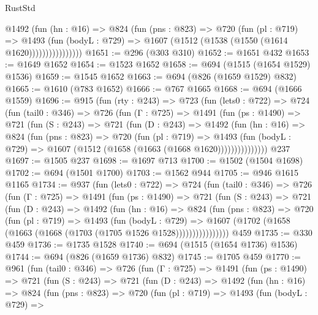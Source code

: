 \begin{lexlean}{RustStd}
\begin{coremodule}
                  @1492
                    (fun (hn : @16) =>
                    @824
                      (fun (pns : @823) =>
                      @720
                        (fun (pl : @719) =>
                        @1493
                          (fun (bodyL : @729) =>
                          @1607 (@1512 (@1538 (@1550 (@1614 @1620))))))))))))))))
@1651 := @296 (@303 @310)
@1652 := @1651 @432
@1653 := @1649 @1652
@1654 := @1523 @1652
@1658 := @694 (@1515 (@1654 @1529) @1536)
@1659 := @1545 @1652
@1663 := @694 (@826 (@1659 @1529) @832)
@1665 := @1610 (@783 @1652)
@1666 := @767 @1665
@1668 := @694 (@1666 @1559)
@1696 := @915
    (fun (rty : @243) =>
    @723
      (fun (lets0 : @722) =>
      @724
        (fun (tail0 : @346) =>
        @726
          (fun (Γ : @725) =>
          @1491
            (fun (ps : @1490) =>
            @721
              (fun (S : @243) =>
              @721
                (fun (D : @243) =>
                @1492
                  (fun (hn : @16) =>
                  @824
                    (fun (pns : @823) =>
                    @720
                      (fun (pl : @719) =>
                      @1493
                        (fun (bodyL : @729) =>
                        @1607 (@1512 (@1658 (@1663 (@1668 @1620)))))))))))))))
    @237
@1697 := @1505 @237
@1698 := @1697 @713
@1700 := @1502 (@1504 @1698)
@1702 := @694 (@1501 @1700)
@1703 := @1562 @944
@1705 := @946 @1615 @1165
@1734 := @937
    (fun (lets0 : @722) =>
    @724
      (fun (tail0 : @346) =>
      @726
        (fun (Γ : @725) =>
        @1491
          (fun (ps : @1490) =>
          @721
            (fun (S : @243) =>
            @721
              (fun (D : @243) =>
              @1492
                (fun (hn : @16) =>
                @824
                  (fun (pns : @823) =>
                  @720
                    (fun (pl : @719) =>
                    @1493
                      (fun (bodyL : @729) =>
                      @1607 (@1702 (@1658 (@1663 (@1668 (@1703 (@1705 @1526 @1528))))))))))))))))
    @459
@1735 := @330 @459
@1736 := @1735 @1528
@1740 := @694 (@1515 (@1654 @1736) @1536)
@1744 := @694 (@826 (@1659 @1736) @832)
@1745 := @1705 @459
@1770 := @961
    (fun (tail0 : @346) =>
    @726
      (fun (Γ : @725) =>
      @1491
        (fun (ps : @1490) =>
        @721
          (fun (S : @243) =>
          @721
            (fun (D : @243) =>
            @1492
              (fun (hn : @16) =>
              @824
                (fun (pns : @823) =>
                @720
                  (fun (pl : @719) =>
                  @1493
                    (fun (bodyL : @729) =>

\end{coremodule}
\end{lexlean}
